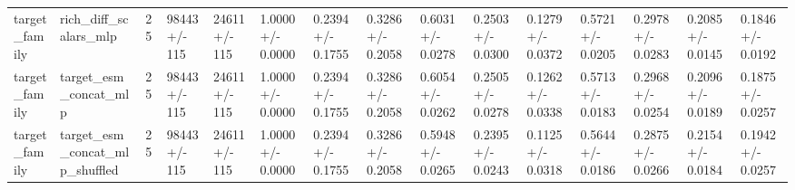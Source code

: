 \begin{longtable}{lllllllllllllll}
target\_family & rich\_diff\_scalars\_mlp & 25 & 98443 +/- 115 & 24611 +/- 115 & 1.0000 +/- 0.0000 & 0.2394 +/- 0.1755 & 0.3286 +/- 0.2058 & 0.6031 +/- 0.0278 & 0.2503 +/- 0.0300 & 0.1279 +/- 0.0372 & 0.5721 +/- 0.0205 & 0.2978 +/- 0.0283 & 0.2085 +/- 0.0145 & 0.1846 +/- 0.0192 \\
target\_family & target\_esm\_concat\_mlp & 25 & 98443 +/- 115 & 24611 +/- 115 & 1.0000 +/- 0.0000 & 0.2394 +/- 0.1755 & 0.3286 +/- 0.2058 & 0.6054 +/- 0.0262 & 0.2505 +/- 0.0278 & 0.1262 +/- 0.0338 & 0.5713 +/- 0.0183 & 0.2968 +/- 0.0254 & 0.2096 +/- 0.0189 & 0.1875 +/- 0.0257 \\
target\_family & target\_esm\_concat\_mlp\_shuffled & 25 & 98443 +/- 115 & 24611 +/- 115 & 1.0000 +/- 0.0000 & 0.2394 +/- 0.1755 & 0.3286 +/- 0.2058 & 0.5948 +/- 0.0265 & 0.2395 +/- 0.0243 & 0.1125 +/- 0.0318 & 0.5644 +/- 0.0186 & 0.2875 +/- 0.0266 & 0.2154 +/- 0.0184 & 0.1942 +/- 0.0257 \\
\end{longtable}
